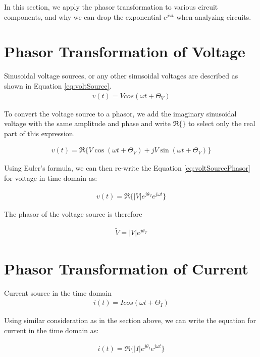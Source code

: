 \documentclass{ximera}
\begin{document}
In this section, we apply the phasor transformation to various circuit components, and why we can drop the exponential $e^{j\omega t}$ when analyzing circuits.


\section{Phasor Transformation of Voltage}


Sinusoidal voltage sources, or any other sinusoidal voltages are described as shown in Equation \ref{eq:voltSource}.
\begin{eqnarray}
v(t)= V cos (\omega t + \Theta_{V} ) \label{eq:voltSource}
\end{eqnarray}

To convert the voltage source to a phasor, we add the imaginary sinusoidal voltage with the same amplitude and phase and write $\Re\{\}$ to select only the real part of this expression.


\begin{eqnarray}
v(t)= \Re \{V \cos (\omega t + \Theta_{V} )+ j V \sin (\omega t + \Theta_{V} ) \} \label{eq:voltSourcePhasor}
\end{eqnarray}

Using Euler's formula, we can then re-write the Equation \ref{eq:voltSourcePhasor} for voltage in time domain as:


\begin{eqnarray}
v(t)=\Re\{|V|e^{j\theta_{V}} e^{j \omega t}\}\label{eq:VoltageDef}
\end{eqnarray}

The phasor of the voltage source is therefore

\begin{eqnarray}
\tilde{V}=|V|e^{j\theta_{V}} 
\end{eqnarray}



\section{Phasor Transformation of  Current}

Current source in the time domain 
\begin{eqnarray}
i(t)= I cos (\omega t + \Theta_{I} ) 
\end{eqnarray}


Using similar consideration as in the section above, we can write the equation for current in the time domain as: 


\begin{eqnarray}
i(t)=\Re\{|I|e^{j\theta_{I}} e^{j \omega t}\}\label{eq:PhCurrentDef} 
\end{eqnarray}
\end{document}
